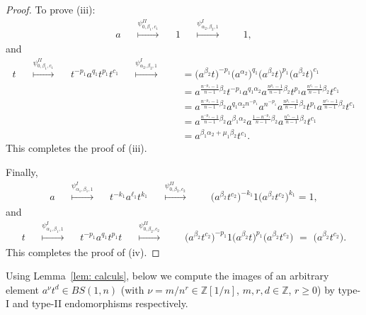 \documentclass[a4paper]{amsart}
\theoremstyle{definition}
\newcommand\ZZ{\mathbb{Z}}
\begin{document}
\begin{proof}
To prove (iii):
%
 \begin{align*}
a \stackrel{\psi^{II}_{0, \beta_1, c_1}}{\qquad\mapsto\qquad} 1 \stackrel{\psi^{I}_{\alpha_2, \beta_2, 1}}{\qquad\mapsto\qquad} & 1 ,
 \end{align*}
%
and
%
\begin{align*}
t \stackrel{\psi^{II}_{0, \beta_1, c_1}}{\qquad\mapsto\qquad}  t^{-p_1}a^{q_1}t^{p_1}t^{c_1} \stackrel{\psi^{I}_{\alpha_2, \beta_2, 1}}{\qquad\mapsto\qquad} & = \big( a^{\beta_2} t\big)^{-p_1} \big( a^{\alpha_2} \big)^{q_1} \big( a^{\beta_2} t\big)^{p_1} \big( a^{\beta_2} t\big)^{c_1}\\ &=  a^{\frac{n^{-p_1}-1}{n-1}\beta_2} t^{-p_1} a^{q_1\alpha_2} a^{\frac{n^{p_1}-1}{n-1}\beta_2} t^{p_1} a^{\frac{n^{c_1}-1}{n-1}\beta_2} t^{c_1} \\&= a^{\frac{n^{-p_1}-1}{n-1}\beta_2} a^{q_1 \alpha_2 n^{-p_1}} a^{n^{-p_1}} a^{\frac{n^{p_1}-1}{n-1}\beta_2} t^{p_1} a^{\frac{n^{c_1}-1}{n-1}\beta_2} t^{c_1}\\
&= a^{\frac{n^{-p_1}-1}{n-1}\beta_2} a^{\beta_1\alpha_2} a^{\frac{1 - n^{-p_1}}{n-1}\beta_2} a^{\frac{n^{c_1}-1}{n-1}\beta_2} t^{c_1} \\ &= a^{\beta_1\alpha_2+\mu_1\beta_2} t^{c_1}.
 \end{align*}
%
This completes the proof of (iii).

Finally,
%
 \begin{align*}
a \stackrel{\psi^I_{\alpha_1, \beta_1, 1}}{\qquad\mapsto\qquad} t^{-k_1} a^{\ell_1} t^{k_1} \stackrel{\psi^{II}_{0, \beta_2, c_2}}{\qquad\mapsto\qquad} & \big( a^{\beta_2} t^{c_2}\big)^{-k_1} 1 \big( a^{\beta_2} t^{c_2}\big)^{k_1}= 1,
 \end{align*}
%
and
%
\begin{align*}
t \stackrel{\psi^I_{\alpha_1, \beta_1, 1}}{\qquad\mapsto\qquad} t^{-p_1} a^{q_1} t^{p_1}t \stackrel{\psi^{II}_{0, \beta_2, c_2}}{\qquad\mapsto\qquad} & \big( a^{\beta_2} t^{c_2}\big)^{-p_1} 1 \big( a^{\beta_2} t\big)^{p_1} \big( a^{\beta_2} t^{c_2}\big) \, \, = \, \, \big( a^{\beta_2} t^{c_2}\big).
 \end{align*}
%
This completes the proof of (iv).
\end{proof}


Using Lemma~\ref{lem: calculs}, below we compute the images of an arbitrary element $a^{\nu}t^d\in BS(1,n)$ (with $\nu=m/n^r\in \ZZ[1/n]$, $m,r,d\in \ZZ$, $r\geq 0$) by type-I and type-II endomorphisms respectively.
\end{document}
